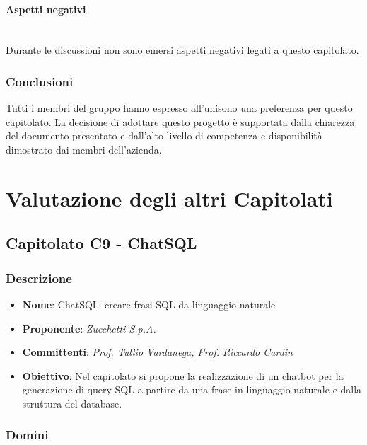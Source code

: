 \documentclass[italian,12pt]{article} %
\begin{document}
\paragraph{Aspetti negativi}\mbox{}\\
Durante le discussioni non sono emersi aspetti negativi legati a questo capitolato.

\subsubsection{Conclusioni}
Tutti i membri del gruppo hanno espresso all'unisono una preferenza per questo capitolato.
La decisione di adottare questo progetto è supportata dalla chiarezza del documento
presentato e dall'alto livello di competenza e disponibilità dimostrato dai membri dell'azienda.

\section{Valutazione degli altri Capitolati}

\subsection{Capitolato C9 - ChatSQL}

\subsubsection{Descrizione}
\begin{itemize}
	\item \textbf{Nome}: ChatSQL: creare frasi SQL da linguaggio naturale
	\item \textbf{Proponente}: {\it Zucchetti S.p.A.}
	\item \textbf{Committenti}: {\it Prof. Tullio Vardanega, Prof. Riccardo Cardin}
	\item \textbf{Obiettivo}: Nel capitolato si propone la realizzazione di un chatbot per la generazione di query SQL a partire da una frase in linguaggio naturale e dalla struttura del database.
\end{itemize}

\subsubsection{Domini}
\end{document}
